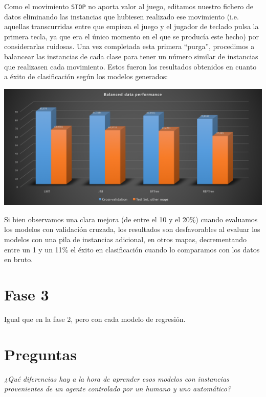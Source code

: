 \documentclass[12pt]{article}
\begin{document}
Como el movimiento \texttt{STOP} no aporta valor al juego, editamos nuestro fichero de datos eliminando las instancias que hubiesen realizado ese movimiento (i.e. aquellas transcurridas entre que empieza el juego y el jugador de teclado pulsa la primera tecla, ya que era el único momento en el que se producía este hecho) por considerarlas ruidosas. Una vez completada esta primera ``purga'', procedimos a balancear las instancias de cada clase para tener un número similar de instancias que realizasen cada movimiento. Estos fueron los resultados obtenidos en cuanto a éxito de clasificación según los modelos generados:

\vspace{0.3cm}

\noindent \includegraphics[width=\textwidth]{balanced_performance}

\vspace{0.3cm}

Si bien observamos una clara mejora (de entre el 10 y el 20\%) cuando evaluamos los modelos con validación cruzada, los resultados son desfavorables al evaluar los modelos con una pila de instancias adicional, en otros mapas, decrementando entre un 1 y un 11\% el éxito en clasificación cuando lo comparamos con los datos en bruto.


\newpage
\section{Fase 3}

Igual que en la fase 2, pero con cada modelo de regresión.

\newpage
\section{Preguntas}

\begin{center}
    \vspace{0.5cm} \emph{¿Qué diferencias hay a la hora de aprender esos modelos con instancias provenientes de un agente controlado por un humano y uno automático?}
    \vspace{0.5cm}
\end{center}
\end{document}
